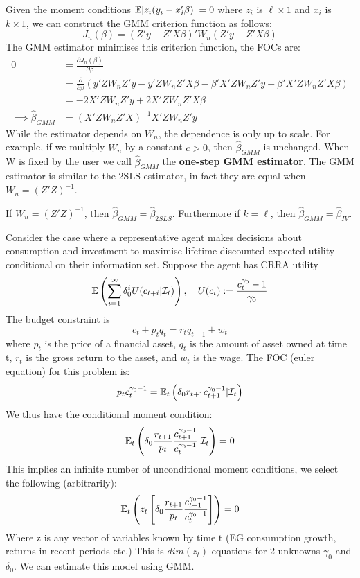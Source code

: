 \documentclass[DIV=14,titlepage=false]{scrreprt}
\begin{document}
 \begin{example}[Overidentified IV]
    Given the moment conditions $\mathbb{E}[z_i(y_i-x_i'\beta)]=0$ where $z_i$ is $ \ell \times 1$ and $x_i$ is $k \times 1$, we can construct the GMM criterion function as follows:
\[
        J_n(\beta) = (Z'y-Z'X\beta)'W_n(Z'y-Z'X\beta)
\]
The GMM estimator minimises this criterion function, the FOCs are: 
\begin{align*}
    0 &= \frac{\partial J_n(\beta)}{\partial \beta} \\
    &= \frac{\partial}{\partial \beta}\left(y'ZW_nZ'y - y'ZW_nZ'X\beta - \beta'X'ZW_nZ'y + \beta'X'ZW_nZ'X\beta \right)\\
    &= -2X'ZW_nZ'y + 2X'ZW_nZ'X\beta \\
    \implies \hat\beta_{GMM} &= (X'ZW_nZ'X)^{-1}X'ZW_nZ'y
\end{align*}
While the estimator depends on $W_n$, the dependence is only up to scale.  For example, if we multiply $W_n$ by a constant $c>0$, then $\hat\beta_{GMM}$ is unchanged. When W is fixed by the user we call $\hat\beta_{GMM}$ the \textbf{one-step GMM estimator}.
The GMM estimator is similar to the 2SLS estimator, in fact they are equal when $W_n=(Z'Z)^{-1}$.
 \end{example}
 \begin{theorem}
    If $W_n = (Z'Z)^{-1}$, then $\hat\beta_{GMM} = \hat\beta_{2SLS}$. Furthermore if $k=\ell$, then $\hat\beta_{GMM} = \hat\beta_{IV}$.
 \end{theorem}
\begin{example}[CAPM]
   Consider the case where a representative agent makes decisions about consumption and investment to maximise lifetime discounted expected utility conditional on their information set. Suppose the agent has CRRA utility
   \[
\mathbb{E}\left(\sum_{i=1}^{\infty}\delta^i_0 U(c_{t+i}|\mathcal{I}_t)\right), \quad U(c_{t}) := \frac{c_{t}^{\gamma_0}-1}{\gamma_0}
   \]
   The budget constraint is
   \[
    c_t +p_tq_t = r_tq_{t-1} + w_t
   \]
   where $p_t$ is the price of a financial asset, $q_t$ is the amount of asset owned at time t, $r_t$ is the gross return to the asset, and $w_t$ is the wage. The FOC (euler equation) for this problem is:
   \[p_t c_t^{\gamma_0-1} = \mathbb{E}_t\left(\delta_0 r_{t+1}c_{t+1}^{\gamma_0-1}|\mathcal{I}_t\right)\]
We thus have the conditional moment condition:  
\[
    \mathbb{E}_t\left(\delta_0 \frac{r_{t+1}}{p_t} \frac{c_{t+1}^{\gamma_0-1}}{c_{t}^{\gamma_0-1}}|\mathcal{I}_t\right)=0
\]
This implies an infinite number of unconditional moment conditions, we select the following (arbitrarily):
\[
    \mathbb{E}_t\left(z_t \left[\delta_0 \frac{r_{t+1}}{p_t} \frac{c_{t+1}^{\gamma_0-1}}{c_{t}^{\gamma_0-1}}\right]\right)=0
\]
Where z is any vector of variables known by time t (EG consumption growth, returns in recent periods etc.) This is $dim(z_t)$ equations for 2 unknowns $\gamma_0$ and $\delta_0$. We can estimate this model using GMM.
\end{example}
\end{document}
